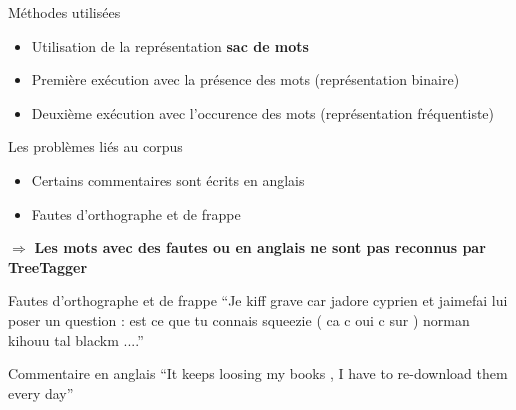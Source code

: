 \documentclass{beamer}
\begin{document}
\begin{frame}
	\begin{block}{Méthodes utilisées}
		\begin{itemize}
			\item Utilisation de la représentation \textbf{sac de mots}
			\item Première exécution avec la présence des mots (représentation binaire)
			\item Deuxième exécution avec l'occurence des mots (représentation fréquentiste)
		\end{itemize}
	\end{block}
\end{frame}

\begin{frame}
	\begin{block}{Les problèmes liés au corpus}
		\begin{itemize}
			\item Certains commentaires sont écrits en anglais
			\item Fautes d'orthographe et de frappe
		\end{itemize}
		
		\vspace{0.5cm}
		
		$\Rightarrow$ \textbf{Les mots avec des fautes ou en anglais ne sont pas reconnus par TreeTagger}
	\end{block}
\end{frame}

\begin{frame}
	\begin{exampleblock}{Fautes d'orthographe et de frappe}
		``Je kiff grave car jadore cyprien et jaimefai lui poser un question : est ce que tu connais squeezie ( ca c oui c sur ) norman kihouu tal blackm ....''\\
		
	\end{exampleblock}
	
	\begin{exampleblock}{Commentaire en anglais}
		``It keeps loosing my books , I have to re-download them every day''
	\end{exampleblock}

\end{frame}
\end{document}
